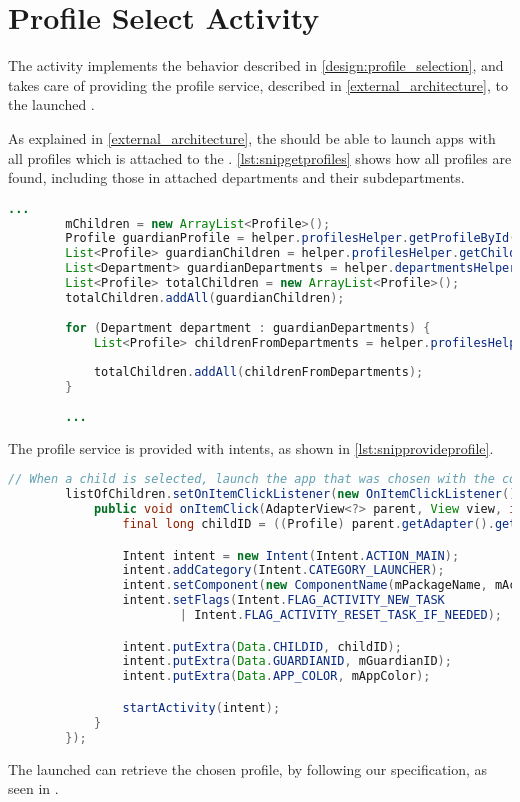 \section{Profile Select Activity}

The  activity implements the behavior described in \autoref{design:profile_selection}, and takes care of providing the profile service, described in \autoref{external_architecture}, to the launched \girafapp[].

As explained in \autoref{external_architecture}, the \guardian[] should be able to launch apps with all profiles which is attached to the \guardian[]. \autoref{lst:snipgetprofiles} shows how all profiles are found, including those in attached departments and their subdepartments.

\begin{lstlisting}[style=sourceCode, language=JAVA, caption=Snippet of the \method{loadApplications} method, label=lst:snipgetprofiles]
		...
		mChildren = new ArrayList<Profile>();
		Profile guardianProfile = helper.profilesHelper.getProfileById(mGuardianID);
		List<Profile> guardianChildren = helper.profilesHelper.getChildrenByGuardian(guardianProfile);
		List<Department> guardianDepartments = helper.departmentsHelper.getDepartmentsByProfile(guardianProfile);
		List<Profile> totalChildren = new ArrayList<Profile>();
		totalChildren.addAll(guardianChildren);
		
		for (Department department : guardianDepartments) {
			List<Profile> childrenFromDepartments = helper.profilesHelper.getChildrenByDepartmentAndSubDepartments(department);
			
			totalChildren.addAll(childrenFromDepartments);
		}
		
		...
\end{lstlisting}

The profile service is provided with intents, as shown in \autoref{lst:snipprovideprofile}.

\begin{lstlisting}[style=sourceCode, language=JAVA, caption=Snippet of the \method{loadApplications} method, label=lst:snipprovideprofile]
		// When a child is selected, launch the app that was chosen with the correct data in the extras.
		listOfChildren.setOnItemClickListener(new OnItemClickListener() {
			public void onItemClick(AdapterView<?> parent, View view, int position, long id) {
				final long childID = ((Profile) parent.getAdapter().getItem(position)).getId();

				Intent intent = new Intent(Intent.ACTION_MAIN);
				intent.addCategory(Intent.CATEGORY_LAUNCHER);
				intent.setComponent(new ComponentName(mPackageName, mActivityName));
				intent.setFlags(Intent.FLAG_ACTIVITY_NEW_TASK
						| Intent.FLAG_ACTIVITY_RESET_TASK_IF_NEEDED);

				intent.putExtra(Data.CHILDID, childID);
				intent.putExtra(Data.GUARDIANID, mGuardianID);
				intent.putExtra(Data.APP_COLOR, mAppColor);

				startActivity(intent);
			}
		});
\end{lstlisting}

The launched \girafapp[] can retrieve the chosen profile, by following our specification, as seen in .
